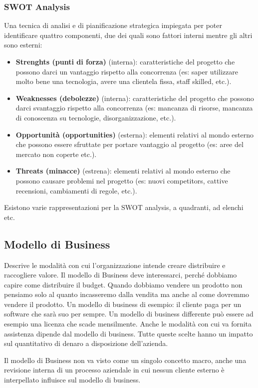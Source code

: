 \subsubsection{SWOT Analysis}
Una tecnica di analisi e di pianificazione strategica impiegata per poter identificare quattro componenti, due dei quali sono fattori interni mentre gli altri sono esterni:
\begin{itemize}
	\item \textbf{Strenghts (punti di forza)} (interna): caratteristiche del progetto che possono darci un vantaggio rispetto alla concorrenza (es: saper utilizzare molto bene una tecnologia, avere una clientela fissa, staff skilled, etc.).
	\item \textbf{Weaknesses (debolezze)} (interna): caratteristiche del progetto che possono darci svantaggio rispetto alla concorrenza (es: mancanza di risorse, mancanza di conoscenza su tecnologie, disorganizzazione, etc.).
	\item \textbf{Opportunità (opportunities)} (esterna): elementi relativi al mondo esterno che possono essere sfruttate per portare vantaggio al progetto (es: aree del mercato non coperte etc.).
	\item \textbf{Threats (minacce)} (estrena): elementi relativi al mondo esterno che possono causare problemi nel progetto (es: nuovi competitors, cattive recensioni, cambiamenti di regole, etc.).
\end{itemize}
Esistono varie rappresentazioni per la SWOT analysis, a quadranti, ad elenchi etc.
\subsection{Modello di  Business}
Descrive le modalità con cui l'organizzazione intende creare distribuire e raccogliere valore. Il modello di Business deve interessarci, perché dobbiamo capire come distribuire il budget. Quando dobbiamo vendere un prodotto non pensiamo solo al quanto incasseremo dalla vendita ma anche al come dovremmo vendere il prodotto. Un modello di business di esempio: il cliente paga per un software che sarà suo per sempre. Un modello di business differente può essere ad esempio una licenza che scade mensilmente. Anche le modalità con cui va fornita assistenza dipende dal modello di business. Tutte queste scelte hanno un impatto sul quantitativo di denaro a disposizione dell'azienda.

\noindent Il modello di Business non va visto come un singolo concetto macro, anche una revisione interna di un processo aziendale in cui nessun cliente esterno è interpellato influisce sul modello di business.

